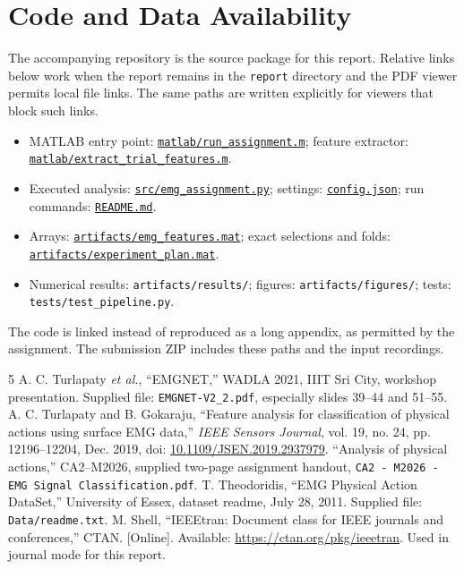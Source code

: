 \documentclass[journal]{IEEEtran}
\begin{document}
\section*{Code and Data Availability}
The accompanying repository is the source package for this report. Relative links below work when the report remains in the \texttt{report} directory and the PDF viewer permits local file links. The same paths are written explicitly for viewers that block such links.
\begin{itemize}
\item MATLAB entry point: \href{run:../matlab/run_assignment.m}{\texttt{matlab/run\_assignment.m}}; feature extractor: \href{run:../matlab/extract_trial_features.m}{\texttt{matlab/extract\_trial\_features.m}}.
\item Executed analysis: \href{run:../src/emg_assignment.py}{\texttt{src/emg\_assignment.py}}; settings: \href{run:../config.json}{\texttt{config.json}}; run commands: \href{run:../README.md}{\texttt{README.md}}.
\item Arrays: \href{run:../artifacts/emg_features.mat}{\texttt{artifacts/emg\_features.mat}}; exact selections and folds: \href{run:../artifacts/experiment_plan.mat}{\texttt{artifacts/experiment\_plan.mat}}.
\item Numerical results: \texttt{artifacts/results/}; figures: \texttt{artifacts/figures/}; tests: \texttt{tests/test\_pipeline.py}.
\end{itemize}
The code is linked instead of reproduced as a long appendix, as permitted by the assignment. The submission ZIP includes these paths and the input recordings.

\begin{thebibliography}{5}
 A. C. Turlapaty \emph{et al.}, ``EMGNET,'' WADLA 2021, IIIT Sri City, workshop presentation. Supplied file: \texttt{EMGNET-V2\_2.pdf}, especially slides 39--44 and 51--55.
 A. C. Turlapaty and B. Gokaraju, ``Feature analysis for classification of physical actions using surface EMG data,'' \emph{IEEE Sensors Journal}, vol. 19, no. 24, pp. 12196--12204, Dec. 2019, doi: \href{https://doi.org/10.1109/JSEN.2019.2937979}{10.1109/JSEN.2019.2937979}.
 ``Analysis of physical actions,'' CA2--M2026, supplied two-page assignment handout, \texttt{CA2 - M2026 - EMG Signal Classification.pdf}.
 T. Theodoridis, ``EMG Physical Action DataSet,'' University of Essex, dataset readme, July 28, 2011. Supplied file: \texttt{Data/readme.txt}.
 M. Shell, ``IEEEtran: Document class for IEEE journals and conferences,'' CTAN. [Online]. Available: \url{https://ctan.org/pkg/ieeetran}. Used in journal mode for this report.
\end{thebibliography}
\end{document}
